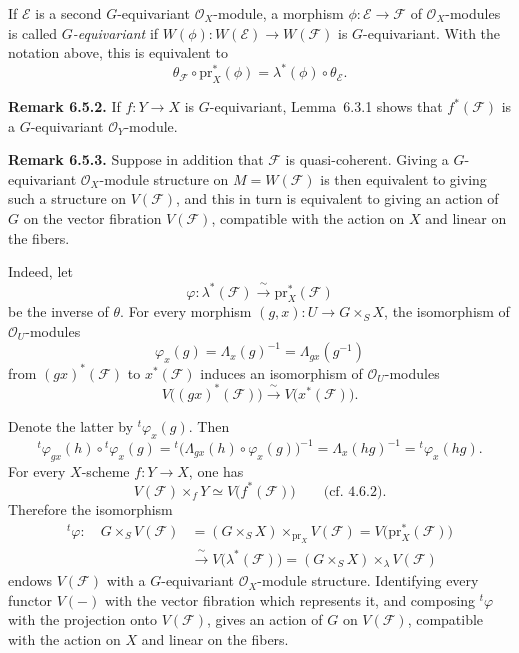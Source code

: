 If \(\mathcal E\) is a second \(G\)-equivariant
\(\mathcal O_X\)-module, a morphism
\(\phi:\mathcal E\to\mathcal F\) of \(\mathcal O_X\)-modules is called
\emph{\(G\)-equivariant} if \(W(\phi):W(\mathcal E)\to W(\mathcal F)\)
is \(G\)-equivariant. With the notation above, this is equivalent to
\[
  \theta_{\mathcal F}\circ\mathrm{pr}_X^*(\phi)
  =\lambda^*(\phi)\circ\theta_{\mathcal E}.
\]

\medskip
\noindent\textbf{Remark 6.5.2.}
If \(f:Y\to X\) is \(G\)-equivariant, Lemma~6.3.1 shows that
\(f^*(\mathcal F)\) is a \(G\)-equivariant
\(\mathcal O_Y\)-module.

\medskip
\noindent\textbf{Remark 6.5.3.}
Suppose in addition that \(\mathcal F\) is quasi-coherent. Giving a
\(G\)-equivariant \(\mathcal O_X\)-module structure on
\(M=W(\mathcal F)\) is then equivalent to giving such a structure on
\(V(\mathcal F)\), and this in turn is equivalent to giving an action
of \(G\) on the vector fibration \(V(\mathcal F)\), compatible with
the action on \(X\) and linear on the fibers.

Indeed, let
\[
  \varphi:\lambda^*(\mathcal F)
  \xrightarrow{\ \sim\ }\mathrm{pr}_X^*(\mathcal F)
\]
be the inverse of \(\theta\). For every morphism
\((g,x):U\to G\times_S X\), the isomorphism of
\(\mathcal O_U\)-modules
\[
  \varphi_x(g)
  =\Lambda_x(g)^{-1}
  =\Lambda_{gx}(g^{-1})
\]
from \((gx)^*(\mathcal F)\) to \(x^*(\mathcal F)\) induces an
isomorphism of \(\mathcal O_U\)-modules
\[
  V\bigl((gx)^*(\mathcal F)\bigr)
  \xrightarrow{\ \sim\ }V\bigl(x^*(\mathcal F)\bigr).
\]

Denote the latter by \({}^{t}\!\varphi_x(g)\). Then
\[
  {}^{t}\!\varphi_{gx}(h)\circ{}^{t}\!\varphi_x(g)
  =
  {}^{t}\!\bigl(\Lambda_{gx}(h)\circ\varphi_x(g)\bigr)^{-1}
  =
  \Lambda_x(hg)^{-1}
  =
  {}^{t}\!\varphi_x(hg).
\]
For every \(X\)-scheme \(f:Y\to X\), one has
\[
  V(\mathcal F)\times_fY\simeq V\bigl(f^*(\mathcal F)\bigr)
  \qquad\text{(cf. 4.6.2).}
\]
Therefore the isomorphism
\[
\begin{aligned}
  {}^{t}\!\varphi:\quad
  G\times_SV(\mathcal F)
  &=(G\times_SX)\times_{\mathrm{pr}_X}V(\mathcal F)
   =V\bigl(\mathrm{pr}_X^*(\mathcal F)\bigr)\\
  &\xrightarrow{\ \sim\ }
   V\bigl(\lambda^*(\mathcal F)\bigr)
   =(G\times_SX)\times_\lambda V(\mathcal F)
\end{aligned}
\]
endows \(V(\mathcal F)\) with a \(G\)-equivariant
\(\mathcal O_X\)-module structure. Identifying every functor \(V(-)\)
with the vector fibration which represents it, and composing
\({}^{t}\!\varphi\) with the projection onto \(V(\mathcal F)\), gives
an action of \(G\) on \(V(\mathcal F)\), compatible with the action on
\(X\) and linear on the fibers.

